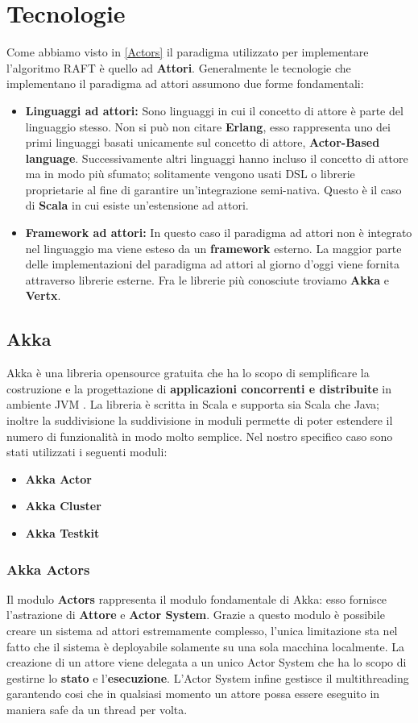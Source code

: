 \section{Tecnologie}
Come abbiamo visto in \ref{Actors} il paradigma utilizzato per implementare l'algoritmo RAFT è quello ad \textbf{Attori}. Generalmente le tecnologie che implementano il paradigma ad attori assumono due forme fondamentali:
\begin{itemize}
  \item{\textbf{Linguaggi ad attori: }}
  Sono linguaggi in cui il concetto di attore è parte del linguaggio stesso. Non si può non citare \textbf{Erlang}, esso rappresenta uno dei primi linguaggi basati unicamente sul concetto di attore, \textbf{Actor-Based language}. Successivamente altri linguaggi hanno incluso il concetto di attore ma in modo più sfumato; solitamente vengono usati DSL o librerie proprietarie al fine di garantire un'integrazione semi-nativa. Questo è il caso di \textbf{Scala} in cui esiste un'estensione ad attori.
  \item{\textbf{Framework ad attori: }}
  In questo caso il paradigma ad attori non è integrato nel linguaggio ma viene esteso da un \textbf{framework} esterno. La maggior parte delle implementazioni del paradigma ad attori al giorno d'oggi viene fornita attraverso librerie esterne. Fra le librerie più conosciute troviamo \textbf{Akka} e \textbf{Vertx}.
\end{itemize}

\subsection{Akka}
Akka è una libreria opensource gratuita che ha lo scopo di semplificare la costruzione e la progettazione di \textbf{applicazioni concorrenti e distribuite} in ambiente JVM \cite{akkaSite}. La libreria è scritta in Scala e supporta sia Scala che Java; inoltre la suddivisione la suddivisione in moduli permette di poter estendere il numero di funzionalità in modo molto semplice. Nel nostro specifico caso sono stati utilizzati i seguenti moduli:
\begin{itemize}
  \item{\textbf{Akka Actor}}
  \item{\textbf{Akka Cluster}}
  \item{\textbf{Akka Testkit}}
\end{itemize} 

  \subsubsection{Akka Actors}
  Il modulo \textbf{Actors} rappresenta il modulo fondamentale di Akka: esso fornisce l'astrazione di \textbf{Attore} e \textbf{Actor System}. Grazie a questo modulo è possibile creare un sistema ad attori estremamente complesso, l'unica limitazione sta nel fatto che il sistema è deployabile solamente su una sola macchina localmente. La creazione di un attore viene delegata a un unico Actor System che ha lo scopo di gestirne lo \textbf{stato} e l'\textbf{esecuzione}. L'Actor System infine gestisce il multithreading garantendo cosi che in qualsiasi momento un attore possa essere eseguito in maniera safe da un thread per volta.   
